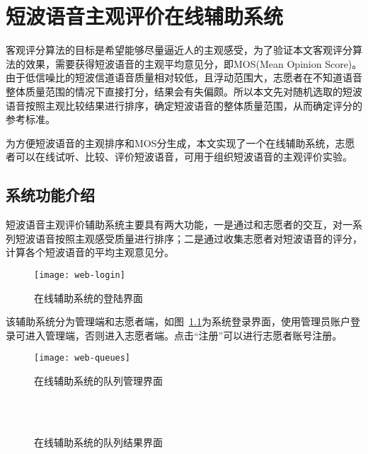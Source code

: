 \chapter{短波语音主观评价在线辅助系统} \label{chapter:web}


客观评分算法的目标是希望能够尽量逼近人的主观感受，为了验证本文客观评分算法的效果，需要获得短波语音的主观平均意见分，即MOS(Mean Opinion Score)。由于低信噪比的短波信道语音质量相对较低，且浮动范围大，志愿者在不知道语音整体质量范围的情况下直接打分，结果会有失偏颇。所以本文先对随机选取的短波语音按照主观比较结果进行排序，确定短波语音的整体质量范围，从而确定评分的参考标准。

为方便短波语音的主观排序和MOS分生成，本文实现了一个在线辅助系统，志愿者可以在线试听、比较、评价短波语音，可用于组织短波语音的主观评价实验。

\section{系统功能介绍}

短波语音主观评价辅助系统主要具有两大功能，一是通过和志愿者的交互，对一系列短波语音按照主观感受质量进行排序；二是通过收集志愿者对短波语音的评分，计算各个短波语音的平均主观意见分。

\begin{figure}
\centering
\texttt{[image: web-login]}
\caption{在线辅助系统的登陆界面\label{fig:web-login}}
\end{figure}

该辅助系统分为管理端和志愿者端，如图~\ref{fig:web-login}为系统登录界面，使用管理员账户登录可进入管理端，否则进入志愿者端。点击“注册”可以进行志愿者账号注册。

\begin{figure}
\centering
\texttt{[image: web-queues]}
\caption{在线辅助系统的队列管理界面\label{fig:web-queues}}
\end{figure}

\begin{figure}
\centering
{}
\vspace{1.2ex}
\\
\vspace{0.8ex}
\\
\caption{在线辅助系统的队列结果界面\label{fig:web-result}}
\end{figure}

